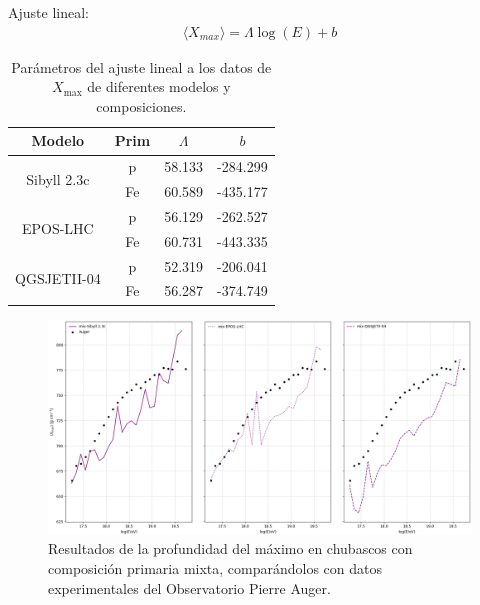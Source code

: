 \documentclass[11pt,table,compress]{beamer}
\begin{document}
	\begin{frame}
	Ajuste lineal:
		\begin{align*}
		\langle X_{max} \rangle = \Lambda \log(E) + b
		\end{align*}
	\begin{table}[] 
	\centering
	\caption{Parámetros del ajuste lineal a los datos de $X_{\text{max}}$ de diferentes modelos y composiciones.}
		\begin{tabular}{c|c|cc}
		\hline
		Modelo                       &  Prim  	& $\Lambda$ 	& $b$      \\ \hline
		\multirow{2}{*}{Sibyll 2.3c} & 	p  		& 58.133    	& -284.299 \\  
		                             & 	Fe 		& 60.589    	& -435.177 \\ \hline
		\multirow{2}{*}{EPOS-LHC}    & 	p  		& 56.129    	& -262.527 \\  
		                             & 	Fe 		& 60.731    	& -443.335 \\ \hline
		\multirow{2}{*}{QGSJETII-04} & 	p  		& 52.319    	& -206.041 \\ 
		                             & 	Fe 		& 56.287    	& -374.749 \\ \hline
		\end{tabular}
	\label{linear_params}
	\end{table}
	\end{frame}
	
	\begin{frame}
		\begin{figure}[] 
			\centering
			\includegraphics[width=\textwidth, height=0.7\textheight]{Figuras/Xmax_mix}
			\caption{Resultados de la profundidad del máximo en chubascos con composición primaria mixta, comparándolos con datos experimentales del Observatorio Pierre Auger.}
			\label{fig:xmax_mix}
		\end{figure}
	\end{frame}			
	
\end{document}
